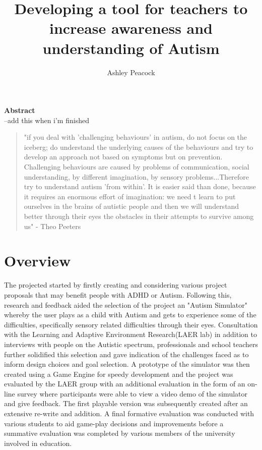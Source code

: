 \documentclass[11pt]{report}
\begin{document}
\title{Developing a tool for teachers to increase awareness and understanding of Autism}
\author{Ashley Peacock}
\maketitle

\textbf{Abstract}\\
--add this when i'm finished 

\begin{quote}
"if you deal with 'challenging behaviours' in autism, do not focus on the iceberg; do understand the underlying causes of the behaviours and try to develop an approach not based on symptoms but on prevention. Challenging behaviours are caused by problems of communication, social understanding, by different imagination, by sensory problems...Therefore try to understand autism 'from within'. It is easier said than done, because it requires an enormous effort of imagination: we need t learn to put ourselves in the brains of autistic people and then we will understand better through their eyes the obstacles in their attempts to survive among us" - Theo Peeters \cite{olgab}
\end{quote}

\tableofcontents


\chapter{Overview}

The projected started by firstly creating and considering various project proposals that may benefit people with ADHD or Autism. Following this, research and feedback aided the selection of the project an "Autism Simulator" whereby the user plays as a child with Autism and gets to experience some of the difficulties, specifically sensory related difficulties through their eyes. Consultation with the Learning and Adaptive Environment Research(LAER lab) in addition to interviews with people on the Autistic spectrum, professionals and school teachers further solidified this selection and gave indication of the challenges faced as to inform design choices and goal selection. A prototype of the simulator was then created using a Game Engine for speedy development and the project was evaluated by the LAER group with an additional evaluation in the form of an on-line survey where participants were able to view a video demo of the simulator and give feedback. The first playable version was subsequently created after an extensive re-write and addition. A final formative evaluation was conducted with various students to aid game-play decisions and improvements before a summative evaluation was completed by various members of the university involved in education. 
\end{document}
